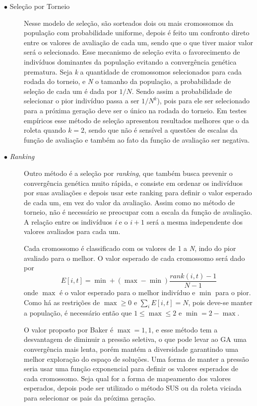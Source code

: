 \begin{description}
\item[$\bullet$ Seleção por Torneio] \text{}

Nesse modelo de seleção, são sorteados dois ou mais cromossomos da população com probabilidade uniforme, depois é feito um confronto direto entre os valores de avaliação de cada um, sendo que o que tiver maior valor será o selecionado. Esse mecanismo de seleção evita o favorecimento de indivíduos dominantes da população evitando a convergência genética prematura. Seja \textit{k} a quantidade de cromossomos selecionados para cada rodada do torneio, e \textit{N} o tamanho da população, a probabilidade de seleção de cada um é dada por \(1/N\). Sendo assim a probabilidade de selecionar o pior indivíduo passa a ser \(1/N^k\)), pois para ele ser selecionado para a próxima geração deve ser o único na rodada do torneio. Em testes empíricos esse método de seleção apresentou resultados melhores que o da roleta quando \(k=2\), sendo que não é sensível a questões de escalas da função de avaliação e também ao fato da função de avaliação ser negativa. \cite{Linden2008}

\item[$\bullet$ \textit{Ranking}] \text{}

Outro método é a seleção por \textit{ranking}, que também busca prevenir o convergência genética muito rápida, e consiste em ordenar os indivíduos por suas avaliações e depois usar este ranking para definir o valor esperado de cada um, em vez do valor da avaliação. Assim como no método de torneio, não é necessário se preocupar com a escala da função de avaliação. A relação entre os indivíduos \textit{i} e o \(i+1\) será a mesma independente dos valores avaliados para cada um. 

Cada cromossomo é classificado com os valores de 1 a \textit{N}, indo do pior avaliado para o melhor. O valor esperado de cada cromossomo será dado por \[E[i,t] = \min + (\max - \min) \frac{rank(i,t) - 1}{N - 1} \] onde \(\max\) é o valor esperado para o melhor indivíduo e \(\min\) para o pior. Como há as restrições de \(\max \geq 0\) e \(\sum_i E[i,t] = N\), pois deve-se manter a população, é necessário então que \(1 \leq \max \leq 2\) e \(\min = 2 - \max\).

O valor proposto por Baker é \(\max = 1,1\), e esse método tem a desvantagem de diminuir a pressão seletiva, o que pode levar ao GA uma convergência mais lenta, porém mantém a diversidade garantindo uma melhor exploração do espaço de soluções. Uma forma de manter a pressão seria usar uma função exponencial para definir os valores esperados de cada cromossomo. Seja qual for a forma de mapeamento dos valores esperados, depois pode ser utilizado o método SUS ou da roleta viciada para selecionar os pais da próxima geração.\cite{Mitchell1996}



\end{description}
